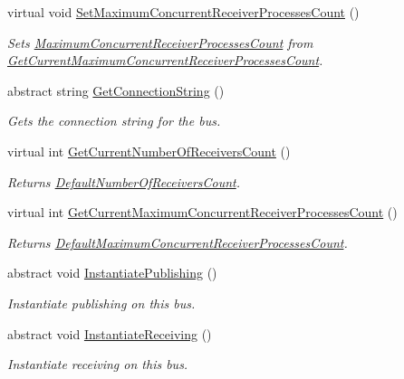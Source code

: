 \begin{DoxyCompactItemize}
virtual void \hyperlink{classCqrs_1_1Azure_1_1ServiceBus_1_1AzureBus_a60cbe46aa3e60528dbd7e07be5132132_a60cbe46aa3e60528dbd7e07be5132132}{Set\+Maximum\+Concurrent\+Receiver\+Processes\+Count} ()
\begin{DoxyCompactList}\small\item\em Sets \hyperlink{classCqrs_1_1Azure_1_1ServiceBus_1_1AzureBus_a6b517888d91c6a5b026cb5857e75a04f_a6b517888d91c6a5b026cb5857e75a04f}{Maximum\+Concurrent\+Receiver\+Processes\+Count} from \hyperlink{classCqrs_1_1Azure_1_1ServiceBus_1_1AzureBus_adfed2926ff68eff521e8c64c02cca2a6_adfed2926ff68eff521e8c64c02cca2a6}{Get\+Current\+Maximum\+Concurrent\+Receiver\+Processes\+Count}. \end{DoxyCompactList}\item 
abstract string \hyperlink{classCqrs_1_1Azure_1_1ServiceBus_1_1AzureBus_a514e371d5ce093678365af31e6c274e3_a514e371d5ce093678365af31e6c274e3}{Get\+Connection\+String} ()
\begin{DoxyCompactList}\small\item\em Gets the connection string for the bus. \end{DoxyCompactList}\item 
virtual int \hyperlink{classCqrs_1_1Azure_1_1ServiceBus_1_1AzureBus_a8489f49aa20b972411e12465baa1bd14_a8489f49aa20b972411e12465baa1bd14}{Get\+Current\+Number\+Of\+Receivers\+Count} ()
\begin{DoxyCompactList}\small\item\em Returns \hyperlink{classCqrs_1_1Azure_1_1ServiceBus_1_1AzureBus_a19642a14d6cf036cbbdb68b9ba7e635d_a19642a14d6cf036cbbdb68b9ba7e635d}{Default\+Number\+Of\+Receivers\+Count}. \end{DoxyCompactList}\item 
virtual int \hyperlink{classCqrs_1_1Azure_1_1ServiceBus_1_1AzureBus_adfed2926ff68eff521e8c64c02cca2a6_adfed2926ff68eff521e8c64c02cca2a6}{Get\+Current\+Maximum\+Concurrent\+Receiver\+Processes\+Count} ()
\begin{DoxyCompactList}\small\item\em Returns \hyperlink{classCqrs_1_1Azure_1_1ServiceBus_1_1AzureBus_a12c3d07b7ad1836e85a449e6adc8b5df_a12c3d07b7ad1836e85a449e6adc8b5df}{Default\+Maximum\+Concurrent\+Receiver\+Processes\+Count}. \end{DoxyCompactList}\item 
abstract void \hyperlink{classCqrs_1_1Azure_1_1ServiceBus_1_1AzureBus_a0bacaa4619921333da4a27371c1d6d0a_a0bacaa4619921333da4a27371c1d6d0a}{Instantiate\+Publishing} ()
\begin{DoxyCompactList}\small\item\em Instantiate publishing on this bus. \end{DoxyCompactList}\item 
abstract void \hyperlink{classCqrs_1_1Azure_1_1ServiceBus_1_1AzureBus_ac9f66dd531dcde49be72ba8f2cb28e9b_ac9f66dd531dcde49be72ba8f2cb28e9b}{Instantiate\+Receiving} ()
\begin{DoxyCompactList}\small\item\em Instantiate receiving on this bus. \end{DoxyCompactList}\end{DoxyCompactItemize}
